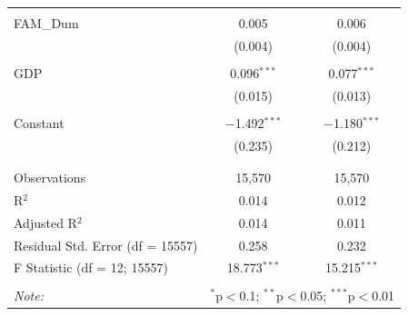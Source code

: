 \documentclass[a4paper]{article}\usepackage[]{graphicx}\usepackage[]{color}
\begin{document}
\begin{table}[!htbp]
\begin{tabular}{@{\extracolsep{5pt}}lcc}
  & & \\ 
 FAM\_Dum & 0.005 & 0.006 \\ 
  & (0.004) & (0.004) \\ 
  & & \\ 
 GDP & 0.096$^{***}$ & 0.077$^{***}$ \\ 
  & (0.015) & (0.013) \\ 
  & & \\ 
 Constant & $-$1.492$^{***}$ & $-$1.180$^{***}$ \\ 
  & (0.235) & (0.212) \\ 
  & & \\ 
\hline \\[-1.8ex] 
Observations & 15,570 & 15,570 \\ 
R$^{2}$ & 0.014 & 0.012 \\ 
Adjusted R$^{2}$ & 0.014 & 0.011 \\ 
Residual Std. Error (df = 15557) & 0.258 & 0.232 \\ 
F Statistic (df = 12; 15557) & 18.773$^{***}$ & 15.215$^{***}$ \\ 
\hline 
\hline \\[-1.8ex] 
\textit{Note:}  & \multicolumn{2}{r}{$^{*}$p$<$0.1; $^{**}$p$<$0.05; $^{***}$p$<$0.01} \\ 
\end{tabular} 
\end{table} 


\newpage
\end{document}
